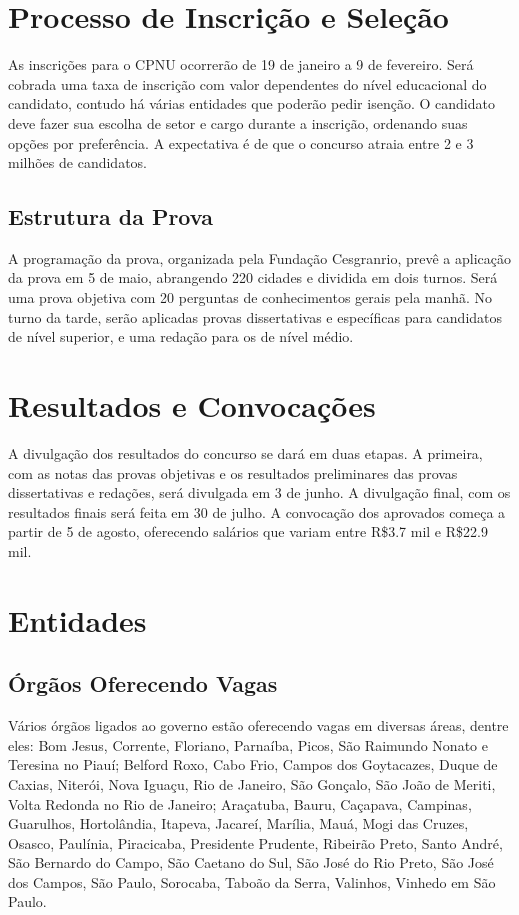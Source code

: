 \documentclass[
   article,       
   12pt,          
   oneside,       
   a4paper,       
   english,       
   brazil,        
   sumario=tradicional
   ]{abntex2}
\begin{document}
\section {Processo de Inscrição e Seleção}
As inscrições para o CPNU ocorrerão de 19 de janeiro a 9 de fevereiro. Será cobrada uma taxa de inscrição com valor dependentes do nível educacional do candidato, contudo há várias entidades que poderão pedir isenção. O candidato deve fazer sua escolha de setor e cargo durante a inscrição, ordenando suas opções por preferência. A expectativa é de que o concurso atraia entre 2 e 3 milhões de candidatos.
\subsection {Estrutura da Prova}
A programação da prova, organizada pela Fundação Cesgranrio, prevê a aplicação da prova em 5 de maio, abrangendo 220 cidades e dividida em dois turnos. Será uma prova objetiva com 20 perguntas de conhecimentos gerais pela manhã. No turno da tarde, serão aplicadas provas dissertativas e específicas para candidatos de nível superior, e uma redação para os de nível médio.
\section {Resultados e Convocações}
A divulgação dos resultados do concurso se dará em duas etapas. A primeira, com as notas das provas objetivas e os resultados preliminares das provas dissertativas e redações, será divulgada em 3 de junho. A divulgação final, com os resultados finais será feita em 30 de julho. A convocação dos aprovados começa a partir de 5 de agosto, oferecendo salários que variam entre R\$3.7 mil e R\$22.9 mil.
\section {Entidades}
\subsection {Órgãos Oferecendo Vagas}
Vários órgãos ligados ao governo estão oferecendo vagas em diversas áreas, dentre eles: Bom Jesus, Corrente, Floriano, Parnaíba, Picos, São Raimundo Nonato e Teresina no Piauí; Belford Roxo, Cabo Frio, Campos dos Goytacazes, Duque de Caxias, Niterói, Nova Iguaçu, Rio de Janeiro, São Gonçalo, São João de Meriti, Volta Redonda no Rio de Janeiro; Araçatuba, Bauru, Caçapava, Campinas, Guarulhos, Hortolândia, Itapeva, Jacareí, Marília, Mauá, Mogi das Cruzes, Osasco, Paulínia, Piracicaba, Presidente Prudente, Ribeirão Preto, Santo André, São Bernardo do Campo, São Caetano do Sul, São José do Rio Preto, São José dos Campos, São Paulo, Sorocaba, Taboão da Serra, Valinhos, Vinhedo em São Paulo.
\end{document}
